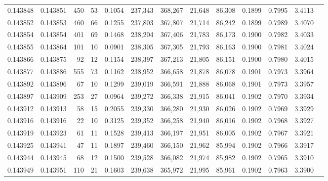 \begin{tabular}{rrrrrrrrrrrrr}
0.143848 & 0.143851 &   450 &  53 &                                     0.1054 & 237,343 & 368,267 &  21,648 &  86,308 & 0.1899 & 0.7995 & 3.4113 \\
0.143852 & 0.143853 &   460 &  66 &                                     0.1255 & 237,803 & 367,807 &  21,714 &  86,242 & 0.1899 & 0.7989 & 3.4070 \\
0.143854 & 0.143854 &   401 &  69 &                                     0.1468 & 238,204 & 367,406 &  21,783 &  86,173 & 0.1900 & 0.7982 & 3.4033 \\
0.143855 & 0.143864 &   101 &  10 &                                     0.0901 & 238,305 & 367,305 &  21,793 &  86,163 & 0.1900 & 0.7981 & 3.4024 \\
0.143866 & 0.143875 &    92 &  12 &                                     0.1154 & 238,397 & 367,213 &  21,805 &  86,151 & 0.1900 & 0.7980 & 3.4015 \\
0.143877 & 0.143886 &   555 &  73 &                                     0.1162 & 238,952 & 366,658 &  21,878 &  86,078 & 0.1901 & 0.7973 & 3.3964 \\
0.143892 & 0.143896 &    67 &  10 &                                     0.1299 & 239,019 & 366,591 &  21,888 &  86,068 & 0.1901 & 0.7973 & 3.3957 \\
0.143897 & 0.143909 &   253 &  27 &                                     0.0964 & 239,272 & 366,338 &  21,915 &  86,041 & 0.1902 & 0.7970 & 3.3934 \\
0.143912 & 0.143913 &    58 &  15 &                                     0.2055 & 239,330 & 366,280 &  21,930 &  86,026 & 0.1902 & 0.7969 & 3.3929 \\
0.143916 & 0.143916 &    22 &  10 &                                     0.3125 & 239,352 & 366,258 &  21,940 &  86,016 & 0.1902 & 0.7968 & 3.3927 \\
0.143919 & 0.143923 &    61 &  11 &                                     0.1528 & 239,413 & 366,197 &  21,951 &  86,005 & 0.1902 & 0.7967 & 3.3921 \\
0.143925 & 0.143941 &    47 &  11 &                                     0.1897 & 239,460 & 366,150 &  21,962 &  85,994 & 0.1902 & 0.7966 & 3.3917 \\
0.143944 & 0.143945 &    68 &  12 &                                     0.1500 & 239,528 & 366,082 &  21,974 &  85,982 & 0.1902 & 0.7965 & 3.3910 \\
0.143949 & 0.143951 &   110 &  21 &                                     0.1603 & 239,638 & 365,972 &  21,995 &  85,961 & 0.1902 & 0.7963 & 3.3900 \\

\end{tabular}
